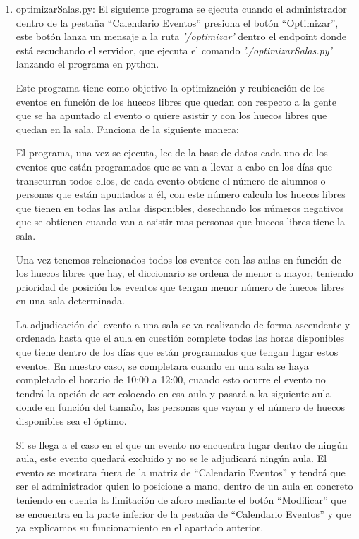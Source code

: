 \documentclass[a4paper, 12pt]{book}
\begin{document}
\begin{enumerate}
  	
  	\item optimizarSalas.py: El siguiente programa se ejecuta cuando el administrador dentro de la pestaña ``Calendario Eventos'' presiona el botón ``Optimizar'', este botón lanza un mensaje a la ruta \textit{'/optimizar'} dentro el endpoint donde está escuchando el servidor, que ejecuta el comando \textit{'./optimizarSalas.py'} lanzando el programa en python. 
  	
  	Este programa tiene como objetivo la optimización y reubicación de los eventos en función de los huecos libres que quedan con respecto a la gente que se ha apuntado al evento o quiere asistir y con los huecos libres que quedan en la sala. Funciona de la siguiente manera:
  	
  	El programa, una vez se ejecuta, lee de la base de datos cada uno de los eventos que están programados que se van a llevar a cabo en los días que transcurran todos ellos, de cada evento obtiene el número de alumnos o personas que están apuntados a él, con este número calcula los huecos libres que tienen en todas las aulas disponibles, desechando los números negativos que se obtienen cuando van a asistir mas personas que huecos libres tiene la sala.
  	
  	Una vez tenemos relacionados todos los eventos con las aulas en función de los huecos libres que hay, el diccionario se ordena de menor a mayor, teniendo prioridad de posición los eventos que tengan menor número de huecos libres en una sala determinada.
  	 
  	La adjudicación del evento a una sala se va realizando de forma ascendente y ordenada hasta que el aula en cuestión complete todas las horas disponibles que tiene dentro de los días que están programados que tengan lugar estos eventos. En nuestro caso, se completara cuando en una sala se haya completado el horario de 10:00 a 12:00, cuando esto ocurre el evento no tendrá la opción de ser colocado en esa aula y pasará a ka siguiente aula donde en función del tamaño, las personas que vayan y el número de huecos disponibles sea el óptimo.
  	
  	Si se llega a el caso en el que un evento no encuentra lugar dentro de ningún aula, este evento quedará excluido y no se le adjudicará ningún aula. El evento se mostrara fuera de la matriz de ``Calendario Eventos''  y tendrá que ser el administrador quien lo posicione a mano, dentro de un aula en concreto teniendo en cuenta la limitación de aforo mediante el botón ``Modificar'' que se encuentra en la parte inferior de la pestaña de ``Calendario Eventos'' y que ya explicamos su funcionamiento en el apartado anterior.
	\end{enumerate}
\end{document}
